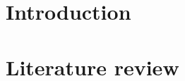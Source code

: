 \documentclass[a4paper,11pt]{article}
\begin{document}



\section{Introduction}
\label{sec:intro}



\section{Literature review}
\label{sec:litrev}







\end{document}
